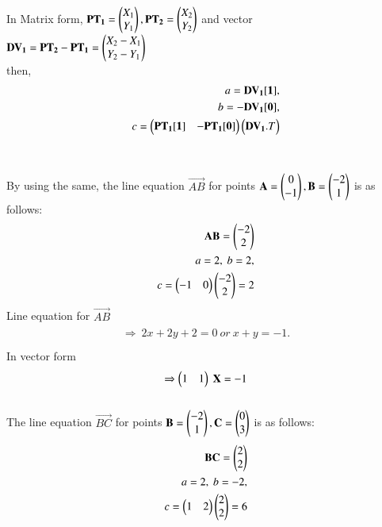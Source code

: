 \documentclass[journal,12pt,twocolumn]{IEEEtran}
\begin{document}
In Matrix form, $\mathbf{PT_1} = \begin{pmatrix}X_1\\Y_1\end{pmatrix}, \mathbf{PT_2} = \begin{pmatrix}X_2\\Y_2\end{pmatrix}$ and vector \\$\mathbf{DV_1} = \mathbf{PT_2 - PT_1} =\begin{pmatrix}X_2-X_1\\ Y_2-Y_1\end{pmatrix}$ \\then, 
\begin{align}
\begin{split}
a= \mathbf{DV_1[1]},\\ b=-\mathbf{DV_1[0]},\\ c = \begin{pmatrix}\mathbf{PT_1[1]}&-\mathbf{PT_1[0]}\end{pmatrix} \begin{pmatrix}\mathbf{DV_1}.T\end{pmatrix}
\end{split}
\end{align}
\\
\\
By using the same, the line equation $\vec{AB}$ for points $\mathbf{A} = \begin{pmatrix}0\\-1\end{pmatrix},\mathbf{B}=\begin{pmatrix}-2\\1\end{pmatrix}$ is as follows:
\\
\begin{align}
\begin{split}
\mathbf{AB} = \begin{pmatrix}-2\\2\end{pmatrix}\\
a=2,\ b=2,\\
c=\begin{pmatrix}-1 & 0\end{pmatrix} \begin{pmatrix}-2\\2\end{pmatrix}=2\\
\end{split}
\end{align}
Line equation for $\vec{AB}$
\begin{align}
\begin{split}
\Rightarrow\ 2x+2y+2=0 \ or \ x+y=-1. \\
\end{split}
\end{align}
In vector form
\begin{align}
\begin{split}
\Rightarrow \begin{pmatrix}1&1\end{pmatrix}\ \mathbf{X}=-1\\
\end{split}
\end{align}
\\
The line equation $\vec{BC}$ for points $\mathbf{B} = \begin{pmatrix}-2\\1\end{pmatrix},\mathbf{C}=\begin{pmatrix}0\\3\end{pmatrix}$ is as follows:
\\
\begin{align}
\begin{split}
\mathbf{BC} = \begin{pmatrix}2\\2\end{pmatrix}\\
a=2,\ b=-2,\\
c=\begin{pmatrix}1 & 2\end{pmatrix} \begin{pmatrix}2\\2\end{pmatrix}=6\\
\end{split}
\end{align}
\end{document}
